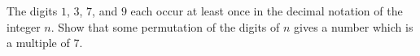 \documentclass[varwidth]{standalone}
\begin{document}
    The digits $1$, $3$, $7$, and $9$ each occur at least once in the decimal notation of the integer $n$. Show that some permutation of the digits of $n$ gives a number which is a multiple of $7$.
\end{document}
